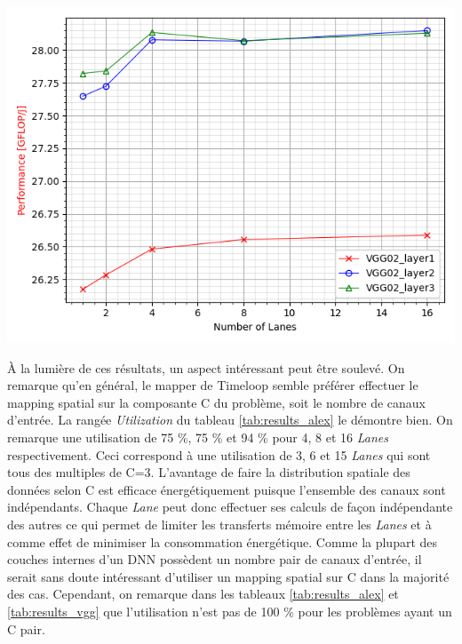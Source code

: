 \documentclass[11pt,letterpaper]{article}
\begin{document}
\begin{multicols}{2}
    {\centering
    \includegraphics[width=\linewidth]{VGG_performance.png}
    \captionsetup{hypcap=false}
    \label{fig:perf_vgg}}
    \bigskip

    À la lumière de ces résultats, un aspect intéressant peut être soulevé. On remarque qu'en général, le mapper de 
    Timeloop semble préférer effectuer le mapping spatial sur la composante C du problème, soit le nombre de canaux d'entrée.
    La rangée \textit{Utilization} du tableau \ref{tab:results_alex} le démontre bien. On remarque une utilisation de 
    75 \%, 75 \% et 94 \% pour 4, 8 et 16 \textit{Lanes} respectivement. Ceci correspond à une utilisation de 3, 6 et 15 \textit{Lanes}
    qui sont tous des multiples de C=3. L'avantage de faire la distribution spatiale des données selon C est efficace énergétiquement
    puisque l'ensemble des canaux sont indépendants. Chaque \textit{Lane} peut donc effectuer ses calculs de façon indépendante des autres
    ce qui permet de limiter les transferts mémoire entre les \textit{Lanes} et à comme effet de minimiser la consommation énergétique.
    Comme la plupart des couches internes d'un DNN possèdent un nombre pair de canaux d'entrée, il serait sans doute intéressant d'utiliser
    un mapping spatial sur C dans la majorité des cas. Cependant, on remarque dans les tableaux \ref{tab:results_alex} et \ref{tab:results_vgg} 
    que l'utilisation n'est pas de 100 \% pour les problèmes ayant un C pair.  


\end{multicols}
\end{document}
